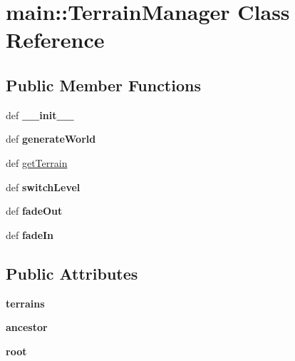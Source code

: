\hypertarget{classmain_1_1TerrainManager}{
\section{main::TerrainManager Class Reference}
\label{classmain_1_1TerrainManager}
}
\subsection*{Public Member Functions}
\begin{DoxyCompactItemize}
\item 
\hypertarget{classmain_1_1TerrainManager_aadeb9d6e9ecc55ed7ea39ee0d546f922}{
def {\bfseries \_\-\_\-init\_\-\_\-}}
\label{classmain_1_1TerrainManager_aadeb9d6e9ecc55ed7ea39ee0d546f922}

\item 
\hypertarget{classmain_1_1TerrainManager_a5b2a8f36bb28a80df315b271f17229bd}{
def {\bfseries generateWorld}}
\label{classmain_1_1TerrainManager_a5b2a8f36bb28a80df315b271f17229bd}

\item 
def \hyperlink{classmain_1_1TerrainManager_a5eb8a934b6eed713b92f1c0fc4ff160d}{getTerrain}
\item 
\hypertarget{classmain_1_1TerrainManager_a7df9a8a3933e9e89437c478b448dbbfd}{
def {\bfseries switchLevel}}
\label{classmain_1_1TerrainManager_a7df9a8a3933e9e89437c478b448dbbfd}

\item 
\hypertarget{classmain_1_1TerrainManager_a57469476edb27c41a4e4e97389aea2de}{
def {\bfseries fadeOut}}
\label{classmain_1_1TerrainManager_a57469476edb27c41a4e4e97389aea2de}

\item 
\hypertarget{classmain_1_1TerrainManager_a85073d5ed30bb530dc57abb4813879b3}{
def {\bfseries fadeIn}}
\label{classmain_1_1TerrainManager_a85073d5ed30bb530dc57abb4813879b3}

\end{DoxyCompactItemize}
\subsection*{Public Attributes}
\begin{DoxyCompactItemize}
\item 
\hypertarget{classmain_1_1TerrainManager_a7ebf37f0b1f953f099c06437f2c192ce}{
{\bfseries terrains}}
\label{classmain_1_1TerrainManager_a7ebf37f0b1f953f099c06437f2c192ce}

\item 
\hypertarget{classmain_1_1TerrainManager_acdc8b4090ebecdac69548c0937ab727a}{
{\bfseries ancestor}}
\label{classmain_1_1TerrainManager_acdc8b4090ebecdac69548c0937ab727a}

\item 
\hypertarget{classmain_1_1TerrainManager_a45b8ff666cc377275c72fd5b08da3797}{
{\bfseries root}}
\label{classmain_1_1TerrainManager_a45b8ff666cc377275c72fd5b08da3797}

\end{DoxyCompactItemize}


